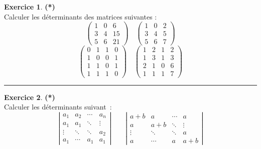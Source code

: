 \documentclass[a4paper,11pt]{article}
\theoremstyle{definition}
\newtheorem{exo}{Exercice} %
\begin{document}
   
\begin{minipage}{1\linewidth}\begin{minipage}[t]{0.48\linewidth}\raggedright
	
\begin{exo}\textbf{(*)}\quad\\[0.2cm]
Calculer les déterminants des matrices suivantes :
$$
\begin{pmatrix}
1 & 0 & 6 \\
3 & 4 & 15\\
5 & 6 & 21
\end{pmatrix}
\quad
\begin{pmatrix}
1 & 0 & 2 \\
3 & 4 & 5  \\
5 & 6  & 7
\end{pmatrix}
$$
$$\begin{pmatrix} 0 & 1 & 1 & 0\\ 1 & 0 & 0 & 1\\ 1 & 1 & 0 & 1\\  1 & 1 & 1 &0\end{pmatrix}\quad
\begin{pmatrix} 1 & 2 & 1 & 2\\ 1 & 3 & 1 & 3\\ 2 & 1 & 0& 6\\ 1 & 1& 1&7\end{pmatrix}
$$
	
\centering\rule{1\linewidth}{0.6pt}\end{exo}



\begin{exo}\textbf{(*)}\quad\\[0.2cm]
	Calculer les déterminants suivant~:
	$$
	\left\vert
	\begin{matrix}
	a_1   &a_2   &\cdots&a_n    \\
	a_1   &a_1   &\ddots&\vdots \\
	\vdots&\ddots&\ddots&a_2    \\
	a_1   &\cdots&a_1   &a_1
	\end{matrix}
	\right\vert
	\qquad
	\left\vert
	\begin{matrix}
	a+b  &    a   & \cdots &  a       \\
	a   &   a+b  & \ddots & \vdots   \\
	\vdots & \ddots & \ddots &  a       \\
	a   & \cdots &    a   & a+b 
	\end{matrix}
	\right\vert
	$$
	

\end{exo}
\end{minipage}
\end{minipage}
\end{document}
